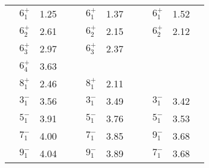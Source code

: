 \documentclass[twoside,12pt]{article}
\begin{document}
\begin{table}[htbp]
\begin{center}
\begin{tabular}{|cccc|cccc|cccc|}
\hline
& $6^{+}_{1}$ & 1.25   &&   &$6^{+}_{1}$ & 1.37   &&   &$6^{+}_{1}$ & 1.52   &\\
& $6^{+}_{2}$ & 2.61   &&   &$6^{+}_{2}$ & 2.15   &&   &$6^{+}_{2}$ & 2.12   &\\
& $6^{+}_{3}$ & 2.97   &&   &$6^{+}_{3}$ & 2.37   &&   &            &        &\\
& $6^{+}_{4}$ & 3.63   &&   &            &        &&   &            &        &\\

\hline
& $8^{+}_{1}$ & 2.46   &&   &$8^{+}_{1}$ & 2.11   &&   &            &        &\\


\hline
& $3^{-}_{1}$ & 3.56   &&   &$3^{-}_{1}$ & 3.49   &&   &$3^{-}_{1}$ &  3.42  &\\

& $5^{-}_{1}$ & 3.91   &&   &$5^{-}_{1}$ & 3.76   &&   &$5^{-}_{1}$ &  3.53  &\\

& $7^{-}_{1}$ & 4.00   &&   &$7^{-}_{1}$ & 3.85   &&   &$9^{-}_{1}$ &  3.68  &\\

& $9^{-}_{1}$ & 4.04   &&   &$9^{-}_{1}$ & 3.89   &&   &$7^{-}_{1}$ &  3.68  &\\


\hline
\end{tabular}
\end{center}
\end{table}
\end{document}
